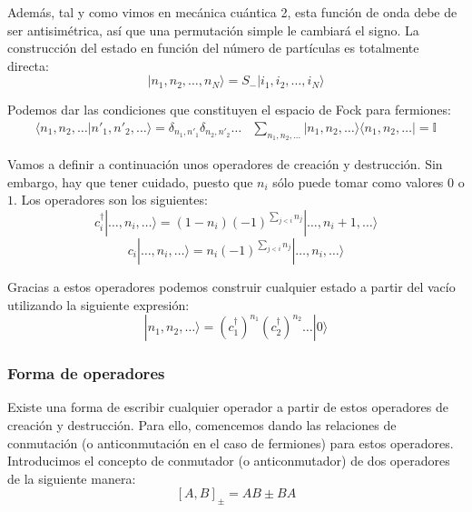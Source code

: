\documentclass[12pt,twoside]{article}
\begin{document}
Además, tal y como vimos en mecánica cuántica 2, esta función de onda debe de ser antisimétrica, así que una permutación simple le cambiará el signo. La construcción del estado en función del número de partículas es totalmente directa:
\begin{equation}
  |n_1, n_2, \ldots, n_N\rangle = S_- |i_1, i_2, \ldots, i_N\rangle
\end{equation}

Podemos dar las condiciones que constituyen el espacio de Fock para fermiones:
$$
\begin{array}{cc}
\langle n_1, n_2, \ldots | n'_1, n'_2, \ldots \rangle = \delta_{n_1, n'_1} \delta_{n_2, n'_2} \ldots & \sum_{n_1, n_2, \ldots} |n_1, n_2, \ldots \rangle \langle n_1, n_2, \ldots | = \mathbb{I}
\end{array}
$$

Vamos a definir a continuación unos operadores de creación y destrucción. Sin embargo, hay que tener cuidado, puesto que $n_i$ sólo puede tomar como valores $0$ o $1$. Los operadores son los siguientes:
\begin{equation}
  c_i^{\dagger} |\ldots, n_i, \ldots\rangle = (1 - n_i) (-1)^{\sum_{j<i} n_j} | \ldots, n_i + 1, \ldots\rangle
\end{equation}
\begin{equation}
  c_i | \ldots, n_i, \ldots\rangle = n_i (-1)^{\sum_{j<i} n_j} | \ldots, n_i, \ldots\rangle
\end{equation}

Gracias a estos operadores podemos construir cualquier estado a partir del vacío utilizando la siguiente expresión:
\begin{equation}
  |n_1, n_2, \ldots\rangle = \left( c_1^{\dagger} \right)^{n_1} \left( c_2^{\dagger} \right)^{n_2} \ldots |0\rangle
\end{equation}

\subsubsection{Forma de operadores}

Existe una forma de escribir cualquier operador a partir de estos operadores de creación y destrucción. Para ello, comencemos dando las relaciones de conmutación (o anticonmutación en el caso de fermiones) para estos operadores. Introducimos el concepto de conmutador (o anticonmutador) de dos operadores de la siguiente manera:
\begin{equation}
  \left[A, B\right]_{\pm} = AB \pm BA
\end{equation}
\end{document}
